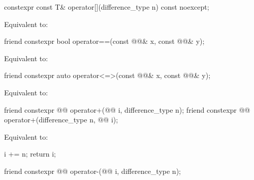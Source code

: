 %
\begin{itemdecl}
constexpr const T& operator[](difference_type n) const noexcept;
\end{itemdecl}

\begin{itemdescr}
\pnum
\effects
Equivalent to: 
\end{itemdescr}

%
\begin{itemdecl}
friend constexpr bool operator==(const @@& x, const @@& y);
\end{itemdecl}

\begin{itemdescr}
\pnum
\effects
Equivalent to: 
\end{itemdescr}

%
\begin{itemdecl}
friend constexpr auto operator<=>(const @@& x, const @@& y);
\end{itemdecl}

\begin{itemdescr}
\pnum
\effects
Equivalent to: 
\end{itemdescr}

%
\begin{itemdecl}
friend constexpr @@ operator+(@@ i, difference_type n);
friend constexpr @@ operator+(difference_type n, @@ i);
\end{itemdecl}

\begin{itemdescr}
\pnum
\effects
Equivalent to:
\begin{codeblock}
i += n;
return i;
\end{codeblock}
\end{itemdescr}

%
\begin{itemdecl}
friend constexpr @@ operator-(@@ i, difference_type n);
\end{itemdecl}

